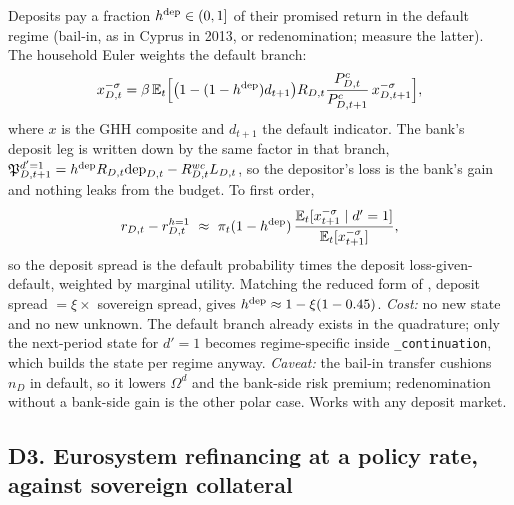 \documentclass[11pt]{article}
\newcommand{\E}{\mathbb{E}}
\newcommand{\Pg}{\mathfrak{P}}
\newcommand{\code}[1]{\texttt{\small #1}}
\begin{document}
Deposits pay a fraction $h^{\rm dep}\in(0,1]$ of their promised return in the default regime
(bail-in, as in Cyprus in 2013, or redenomination; \citealp{krishnamurthy2018ecb} measure the
latter). The household Euler weights the default branch:
\begin{equation}
x_{D,t}^{-\sigma}=\beta\,\E_t\Bigl[\bigl(1-(1-h^{\rm dep})d_{t+1}\bigr)R_{D,t}
\frac{P^c_{D,t}}{P^c_{D,t+1}}\,x_{D,t+1}^{-\sigma}\Bigr],
\label{eq:d2}
\end{equation}
where $x$ is the GHH composite and $d_{t+1}$ the default indicator. The bank's deposit leg is
written down by the same factor in that branch,
$\Pg^{d'=1}_{D,t+1}=h^{\rm dep}R_{D,t}\mathrm{dep}_{D,t}-R^{wc}_{D,t}L_{D,t}$,
so the depositor's loss is the bank's gain and nothing leaks from the budget. To first order,
\begin{equation}
r_{D,t}-r^{h=1}_{D,t}\ \approx\ \pi_t(1-h^{\rm dep})\,
\frac{\E_t[x^{-\sigma}_{t+1}\mid d'=1]}{\E_t[x^{-\sigma}_{t+1}]},
\end{equation}
so the deposit spread is the default probability times the deposit loss-given-default, weighted
by marginal utility. Matching the reduced form of \citet{corsetti2013sovereign}, deposit spread
$=\xi\times$ sovereign spread, gives $h^{\rm dep}\approx1-\xi(1-0.45)$.
\emph{Cost:} no new state and no new unknown. The default branch already exists in the
quadrature; only the next-period state for $d'=1$ becomes regime-specific inside
\code{\_continuation}, which builds the state per regime anyway. \emph{Caveat:} the bail-in
transfer cushions $n_D$ in default, so it lowers $\Omega^d$ and the bank-side risk premium;
redenomination without a bank-side gain is the other polar case. Works with any deposit market.

\subsection*{D3. Eurosystem refinancing at a policy rate, against sovereign collateral}
\end{document}
